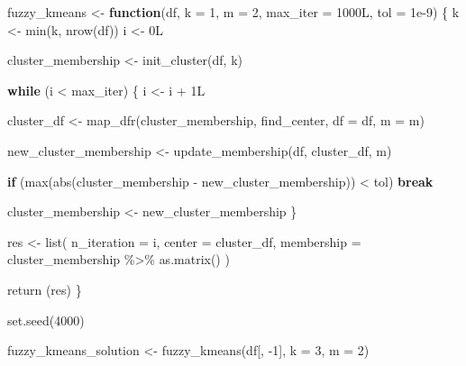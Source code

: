 \documentclass[
]{book}
\newenvironment{Shaded}{\begin{snugshade}}{\end{snugshade}}
\newcommand{\AttributeTok}[1]{\textcolor[rgb]{0.77,0.63,0.00}{#1}}
\newcommand{\ControlFlowTok}[1]{\textcolor[rgb]{0.13,0.29,0.53}{\textbf{#1}}}
\newcommand{\DecValTok}[1]{\textcolor[rgb]{0.00,0.00,0.81}{#1}}
\newcommand{\FloatTok}[1]{\textcolor[rgb]{0.00,0.00,0.81}{#1}}
\newcommand{\FunctionTok}[1]{\textcolor[rgb]{0.00,0.00,0.00}{#1}}
\newcommand{\NormalTok}[1]{#1}
\newcommand{\OtherTok}[1]{\textcolor[rgb]{0.56,0.35,0.01}{#1}}
\newcommand{\SpecialCharTok}[1]{\textcolor[rgb]{0.00,0.00,0.00}{#1}}
\begin{document}
\begin{Shaded}
\begin{Highlighting}[]
\NormalTok{fuzzy\_kmeans }\OtherTok{\textless{}{-}} \ControlFlowTok{function}\NormalTok{(df, }\AttributeTok{k =} \DecValTok{1}\NormalTok{, }\AttributeTok{m =} \DecValTok{2}\NormalTok{, }\AttributeTok{max\_iter =}\NormalTok{ 1000L, }\AttributeTok{tol =} \FloatTok{1e{-}9}\NormalTok{) \{}
\NormalTok{  k }\OtherTok{\textless{}{-}} \FunctionTok{min}\NormalTok{(k, }\FunctionTok{nrow}\NormalTok{(df))}
\NormalTok{  i }\OtherTok{\textless{}{-}}\NormalTok{ 0L}
  
\NormalTok{  cluster\_membership }\OtherTok{\textless{}{-}} \FunctionTok{init\_cluster}\NormalTok{(df, k)}
  
  \ControlFlowTok{while}\NormalTok{ (i }\SpecialCharTok{\textless{}}\NormalTok{ max\_iter) \{}
\NormalTok{    i }\OtherTok{\textless{}{-}}\NormalTok{ i }\SpecialCharTok{+}\NormalTok{ 1L}
    
\NormalTok{    cluster\_df }\OtherTok{\textless{}{-}} \FunctionTok{map\_dfr}\NormalTok{(cluster\_membership, find\_center, }\AttributeTok{df =}\NormalTok{ df, }\AttributeTok{m =}\NormalTok{ m)}
    
\NormalTok{    new\_cluster\_membership }\OtherTok{\textless{}{-}} \FunctionTok{update\_membership}\NormalTok{(df, cluster\_df, m)}
    
    \ControlFlowTok{if}\NormalTok{ (}\FunctionTok{max}\NormalTok{(}\FunctionTok{abs}\NormalTok{(cluster\_membership }\SpecialCharTok{{-}}\NormalTok{ new\_cluster\_membership)) }\SpecialCharTok{\textless{}}\NormalTok{ tol) }\ControlFlowTok{break}
    
\NormalTok{    cluster\_membership }\OtherTok{\textless{}{-}}\NormalTok{ new\_cluster\_membership}
\NormalTok{  \}}
  
\NormalTok{  res }\OtherTok{\textless{}{-}} \FunctionTok{list}\NormalTok{(}
    \AttributeTok{n\_iteration =}\NormalTok{ i,}
    \AttributeTok{center =}\NormalTok{ cluster\_df,}
    \AttributeTok{membership =}\NormalTok{ cluster\_membership }\SpecialCharTok{\%\textgreater{}\%} \FunctionTok{as.matrix}\NormalTok{()}
\NormalTok{  )}
  
  \FunctionTok{return}\NormalTok{ (res)}
\NormalTok{\}}
\end{Highlighting}
\end{Shaded}

\begin{Shaded}
\begin{Highlighting}[]
\FunctionTok{set.seed}\NormalTok{(}\DecValTok{4000}\NormalTok{)}

\NormalTok{fuzzy\_kmeans\_solution }\OtherTok{\textless{}{-}} \FunctionTok{fuzzy\_kmeans}\NormalTok{(df[, }\SpecialCharTok{{-}}\DecValTok{1}\NormalTok{], }\AttributeTok{k =} \DecValTok{3}\NormalTok{, }\AttributeTok{m =} \DecValTok{2}\NormalTok{)}
\end{Highlighting}
\end{Shaded}
\end{document}
